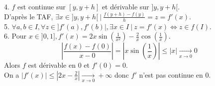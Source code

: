 \documentclass[10pt]{article}
\begin{document}
\begin{tcolorbox}[enhanced, width=7in, center, size=fbox, fontupper=\large, drop shadow southwest]
4. $f$ est continue sur $[y,y+h]$ et dérivable sur $]y,y+h[$.\\
D'après le TAF, $\exists x\in ]y,y+h[ ~ | ~ \frac{f(y+h) - f(y)}{h} = z = f'(x)$.\\[0.2cm]
5. $\forall a,b\in I, \forall z \in ]f'(a), f'(b)|, \exists x \in I ~ | ~ z = f'(x) \iff z \in f(I)$.\\[0.2cm]
6. Pour $x\in]0,1], f'(x)=2x\sin(\frac{1}{x^2})-\frac{2}{x}\cos(\frac{1}{x})$.
\begin{equation*}
    \left|\frac{f(x)-f(0)}{x-0}\right|=|x\sin\left(\frac{1}{x}\right)|\leq|x|\xrightarrow[x\to0]{}0
\end{equation*}
Alors $f$ est dérivable en 0 et $f'(0)=0$.\\
On a $|f'(x)|\leq|2x-\frac{2}{x}|\xrightarrow[x\to0]{}+\infty$ donc $f'$ n'est pas continue en 0.\\
\end{tcolorbox}
\end{document}

